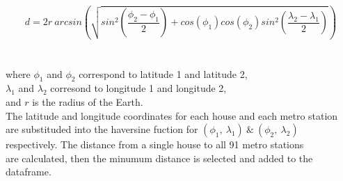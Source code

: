 \documentclass[12pt]{article}
\begin{document}


$$ d=2r\ arcsin \left(\sqrt{sin^{2} \left( \frac{\phi_{2}-\phi_{1}} {2} \right) +cos(\phi_1)cos(\phi_2)sin^2 \left( \frac{\lambda_{2}-\lambda_{1}} {2} \right)       } \right)$$\\\\
\centering
\footnotesize
where $\phi_1$ and $\phi_2$ correspond to latitude 1 and latitude 2,\\ 
 $\lambda_1$ and $\lambda_2$ corresond to longitude 1 and longitude 2, \\ 
and $r$ is the radius of the Earth. \\ 
\bigskip
The latitude and longitude coordinates for each house and each metro station\\
are substituded into the haversine fuction for $(\phi_1,\ \lambda_1) \ \& \  (\phi_2,\ \lambda_2)$ \\
respectively. The distance from a single house to all 91 metro stations\\ are 
calculated, then the minumum distance is selected and added to the dataframe.
\end{document}
